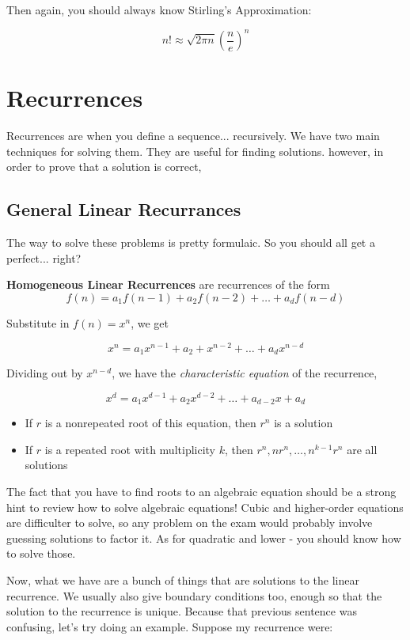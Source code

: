 \documentclass[11pt]{article}
\begin{document}
Then again, you should always know Stirling's Approximation:

$$n! \approx \sqrt{2 \pi n} \left( \frac{n}{e} \right)^n$$

\section{Recurrences}
	Recurrences are when you define a sequence... recursively.  We have two main techniques
	for solving them.  They are useful for finding solutions.  however, in order to prove 
	that a solution is correct, 

	\subsection{General Linear Recurrances}
	The way to solve these problems is pretty formulaic.  So you should all get a perfect... right?
	
	\textbf{Homogeneous Linear Recurrences} are recurrences of the form
	$$f(n) = a_1f(n-1) + a_2f(n-2) + \ldots + a_df(n-d)$$
	
	Substitute in $f(n) = x^n$, we get
	
	$$x^n = a_1 x^{n-1} + a_2 + x^{n-2} + \ldots + a_d x^{n-d}$$
	
	Dividing out by $x^{n-d}$, we have the \emph{characteristic equation} of the recurrence,
	
	$$x^d = a_1 x^{d-1} + a_2x^{d-2} + \ldots + a_{d-2}x + a_d$$
	
	\begin{itemize}
		\item If $r$ is a nonrepeated root of this equation, then $r^n$ is a solution
		
		\item If $r$ is a repeated root with multiplicity $k$, then $r^n, nr^n, \ldots,
		n^{k-1}r^n$ are all solutions
	\end{itemize}
	The fact that you have to find roots to an algebraic equation should be a strong hint to
	review how to solve algebraic equations!  Cubic and higher-order equations are difficulter to solve, so any problem on the exam would probably involve guessing solutions to factor it.  As for quadratic and lower - you should know how to solve those.
	
	Now, what we have are a bunch of things that are solutions to the linear recurrence.
	We usually also give boundary conditions too, enough so that the solution to the
	recurrence is unique.  Because that previous sentence was confusing, let's try 
	doing an example.  Suppose my recurrence were:
	
\end{document}
